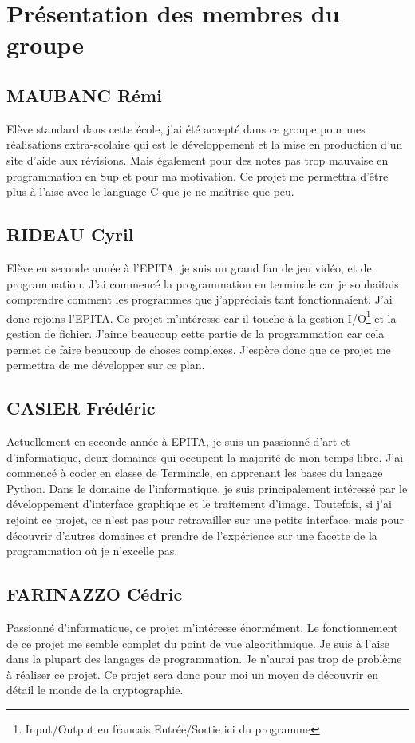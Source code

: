 \section{Présentation des membres du groupe}

    \subsection{MAUBANC Rémi}
        Elève standard dans cette école, j'ai été accepté dans ce groupe pour mes réalisations extra-scolaire qui est le développement et la mise en production d'un site d'aide aux révisions. Mais également pour des notes pas trop mauvaise en programmation en Sup et pour ma motivation. Ce projet me permettra d'être plus à l'aise avec le language C que je ne maîtrise que peu.
        
        
    \subsection{RIDEAU Cyril}
        Elève en seconde année à l'EPITA, je suis un grand fan de jeu vidéo, et de programmation. J'ai commencé la programmation en terminale car je souhaitais comprendre comment les programmes que j'appréciais tant fonctionnaient. J'ai donc rejoins l'EPITA. Ce projet m'intéresse car il touche à la gestion I/O\footnote{Input/Output en francais Entrée/Sortie ici du programme} et la gestion de fichier. J'aime beaucoup cette partie de la programmation car cela permet de faire beaucoup de choses complexes. J'espère donc que ce projet me permettra de me développer sur ce plan.
        
    \subsection{CASIER Frédéric}
    	Actuellement en seconde année à EPITA, je suis un passionné d’art et d’informatique, deux domaines qui occupent la majorité de mon temps libre. J’ai commencé à coder en classe de Terminale, en apprenant les bases du langage Python. Dans le domaine de l'informatique, je suis principalement intéressé par le développement d'interface graphique et le traitement d'image. Toutefois, si j'ai rejoint ce projet, ce n'est pas pour retravailler sur une petite interface, mais pour découvrir d'autres domaines et prendre de l'expérience sur une facette de la programmation où je n'excelle pas.
        
        
    \subsection{FARINAZZO Cédric}
        Passionné d’informatique, ce projet m’intéresse énormément. Le fonctionnement de ce projet me semble complet du point de vue algorithmique. Je suis à l’aise dans la plupart des langages de programmation. Je n’aurai pas trop de problème à réaliser ce projet. Ce projet sera donc pour moi un moyen de découvrir en détail le monde de la cryptographie.
        
